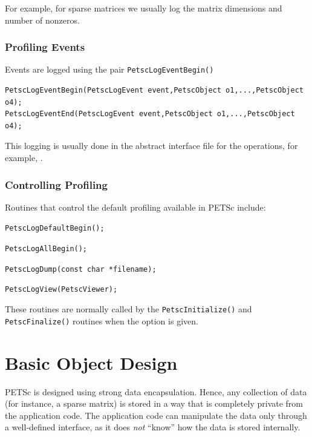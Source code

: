 For example, for sparse matrices we usually log the matrix
dimensions and number of nonzeros.

\subsection{Profiling Events}

Events are logged using the
pair \lstinline{PetscLogEventBegin()}
\begin{lstlisting}
PetscLogEventBegin(PetscLogEvent event,PetscObject o1,...,PetscObject o4);
PetscLogEventEnd(PetscLogEvent event,PetscObject o1,...,PetscObject o4);
\end{lstlisting}
This logging is usually done in the abstract
interface file for the operations, for example, \href{http://www.mcs.anl.gov/petsc/petsc-master/src/mat/interface/matrix.c.html}{}.

\subsection{Controlling Profiling}

Routines that control the default profiling available in PETSc include:
\begin{tightitemize}
  \item\lstinline{PetscLogDefaultBegin();}
  \item\lstinline{PetscLogAllBegin();}
  \item\lstinline{PetscLogDump(const char *filename);}
  \item\lstinline{PetscLogView(PetscViewer);}
\end{tightitemize}
These routines are normally called by the \lstinline{PetscInitialize()}
and \lstinline{PetscFinalize()} routines when the option
 is given.

\chapter{Basic Object Design}
\label{chapter:design}

PETSc is designed using strong data encapsulation.  Hence,
any collection of data (for instance, a sparse matrix) is stored in
a way that is completely private from the application code. The application
code can manipulate the data only through a well-defined interface, as it
does {\em not} ``know'' how the data is stored internally.

